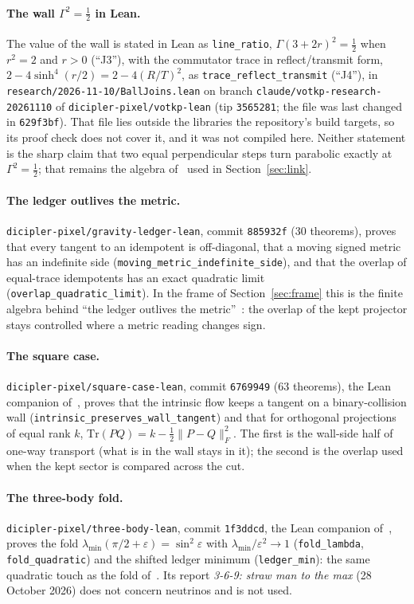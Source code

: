 \paragraph{The wall $\Gamma^2=\tfrac12$ in Lean.} The value of the wall is stated in Lean as \texttt{line\_ratio}, $\Gamma(3+2r)^2=\tfrac12$ when $r^2=2$ and $r>0$ (``J3''), with the commutator trace in reflect/transmit form, $2-4\sinh^4(r/2)=2-4(R/T)^2$, as \texttt{trace\_reflect\_transmit} (``J4''), in \texttt{research/2026-11-10/BallJoins.lean} on branch \texttt{claude/votkp-research-20261110} of \texttt{dicipler-pixel/votkp-lean} (tip \texttt{3565281}; the file was last changed in \texttt{629f3bf}). That file lies outside the libraries the repository's build targets, so its proof check does not cover it, and it was not compiled here. Neither statement is the sharp claim that two equal perpendicular steps turn parabolic exactly at $\Gamma^2=\tfrac12$; that remains the algebra of~\cite{SMball} used in Section~\ref{sec:link}.

\paragraph{The ledger outlives the metric.} \texttt{dicipler-pixel/gravity-ledger-lean}, commit \texttt{885932f} (30 theorems), proves that every tangent to an idempotent is off-diagonal, that a moving signed metric has an indefinite side (\texttt{moving\_metric\_indefinite\_side}), and that the overlap of equal-trace idempotents has an exact quadratic limit (\texttt{overlap\_quadratic\_limit}). In the frame of Section~\ref{sec:frame} this is the finite algebra behind ``the ledger outlives the metric''~\cite{Ledger}: the overlap of the kept projector stays controlled where a metric reading changes sign.

\paragraph{The square case.} \texttt{dicipler-pixel/square-case-lean}, commit \texttt{6769949} (63 theorems), the Lean companion of~\cite{SquareCase}, proves that the intrinsic flow keeps a tangent on a binary-collision wall (\texttt{intrinsic\_preserves\_wall\_tangent}) and that for orthogonal projections of equal rank $k$, $\mathrm{Tr}(PQ)=k-\tfrac12\|P-Q\|_F^2$. The first is the wall-side half of one-way transport (what is in the wall stays in it); the second is the overlap used when the kept sector is compared across the cut.

\paragraph{The three-body fold.} \texttt{dicipler-pixel/three-body-lean}, commit \texttt{1f3ddcd}, the Lean companion of~\cite{ThreeBody}, proves the fold $\lambda_{\min}(\pi/2+\varepsilon)=\sin^2\varepsilon$ with $\lambda_{\min}/\varepsilon^2\to1$ (\texttt{fold\_lambda}, \texttt{fold\_quadratic}) and the shifted ledger minimum (\texttt{ledger\_min}): the same quadratic touch as the fold of~\cite{BH}. Its report \emph{3-6-9: straw man to the max} (28 October 2026) does not concern neutrinos and is not used.

